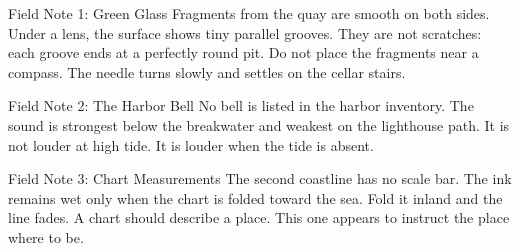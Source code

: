 \begin{fieldnote}{Field Note 1: Green Glass}
Fragments from the quay are smooth on both sides. Under a lens, the surface
shows tiny parallel grooves. They are not scratches: each groove ends at a
perfectly round pit. Do not place the fragments near a compass. The needle
turns slowly and settles on the cellar stairs.
\end{fieldnote}

\begin{fieldnote}{Field Note 2: The Harbor Bell}
No bell is listed in the harbor inventory. The sound is strongest below the
breakwater and weakest on the lighthouse path. It is not louder at high tide.
It is louder when the tide is absent.
\end{fieldnote}

\begin{fieldnote}{Field Note 3: Chart Measurements}
The second coastline has no scale bar. The ink remains wet only when the
chart is folded toward the sea. Fold it inland and the line fades. A chart
should describe a place. This one appears to instruct the place where to be.
\end{fieldnote}
